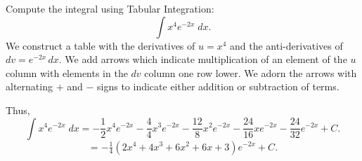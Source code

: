 \documentclass[handout]{ximera}
\begin{document}
\begin{example}[example 5]
Compute the integral using Tabular Integration:
  \[
  \int x^4 e^{-2x} \;dx.
  \]
We construct a table with the derivatives of $u = x^4$ and the anti-derivatives of $dv = e^{-2x} \, dx$.
We add arrows which indicate multiplication of an element of the $u$ column with elements in the $dv$ column one row lower.
We adorn the arrows with alternating $+$ and $-$ signs to indicate either addition or subtraction of terms.
\begin{image}[5cm]
\end{image}

Thus,
\[
  \int x^4 e^{-2x} \;dx = -\frac12 x^4 e^{-2x} - \frac44x^3 e^{-2x} - \frac{12}{8} x^2 e^{-2x} - \frac{24}{16}x e^{-2x} - \frac{24}{32} e^{-2x} + C.
  \]
\[
= -\tfrac14\left(2 x^4 + 4x^3  + 6 x^2  + 6x  + 3\right) e^{-2x} + C.
\]
\end{example}
\end{document}
